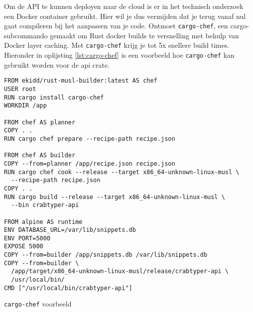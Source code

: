 Om de API te kunnen deployen naar de cloud is er in het technisch onderzoek een Docker container
gebruikt. Hier wil je dus vermijden dat je terug vanaf nul gaat compileren bij het aanpassen van je
code. Ontmoet \texttt{cargo-chef}, een cargo-subcommando gemaakt om Rust docker builds te
versnelling met behulp van Docker layer caching. Met \texttt{cargo-chef} krijg je tot 5x
snellere build times. Hieronder in oplijsting \ref{lst:cargo-chef} is een voorbeeld hoe
\texttt{cargo-chef} kan gebruikt worden voor de api crate.

\begin{listing}[h]
\begin{verbatim}
FROM ekidd/rust-musl-builder:latest AS chef
USER root
RUN cargo install cargo-chef
WORKDIR /app

FROM chef AS planner
COPY . .
RUN cargo chef prepare --recipe-path recipe.json

FROM chef AS builder
COPY --from=planner /app/recipe.json recipe.json
RUN cargo chef cook --release --target x86_64-unknown-linux-musl \
  --recipe-path recipe.json
COPY . .
RUN cargo build --release --target x86_64-unknown-linux-musl \
  --bin crabtyper-api

FROM alpine AS runtime
ENV DATABASE_URL=/var/lib/snippets.db
ENV PORT=5000
EXPOSE 5000
COPY --from=builder /app/snippets.db /var/lib/snippets.db
COPY --from=builder \
  /app/target/x86_64-unknown-linux-musl/release/crabtyper-api \
  /usr/local/bin/
CMD ["/usr/local/bin/crabtyper-api"]
\end{verbatim}
\caption{\texttt{cargo-chef} voorbeeld}
\label{lst:cargo-chef}
\end{listing}


